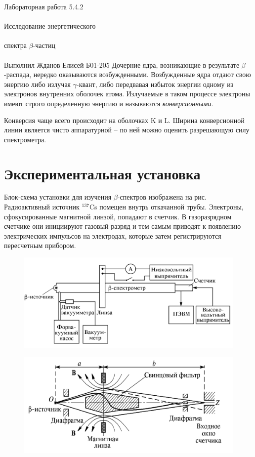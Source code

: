 \documentclass{astroedu-lab}
\begin{document}
\begin{problem}{\huge Лабораторная работа 5.4.2\\\\Исследование энергетического\\\\спектра $\beta$-частиц\\\\Выполнил Жданов Елисей Б01-205}
	Дочерние ядра, возникающие в результате $\beta$-распада, нередко оказываются возбужденными. Возбужденные ядра отдают свою энергию либо излучая $\gamma$-квант, либо передвавая избыток энергии одному из электронов внутренних оболочек атома. Излучаемые в таком процессе электроны имеют строго определенную энергию и называются \textit{конверсионными}.
	
	Конверсия чаще всего происходит на оболочках K и L. Ширина конверсионной линии является чисто аппаратурной -- по ней можно оценить разрешающую силу спектрометра.
	

\section{Экспериментальная установка}

Блок-схема установки для изучения $\beta$-спектров изображена на рис. Радиоактивный источник $^{137}$Cs помещен внутрь откачанной трубы. Электроны, сфокусированные магнитной линзой, попадают в счетчик. В газоразрядном счетчике они инициируют газовый разряд и тем самым приводят к появлению электрических импульсов на электродах, которые затем регистрируются пересчетным прибором.
	
	
\begin{figure}[!h]
	\centering
	\includegraphics[width=1\textwidth]{shema.png}
	\label{fig:boiler}
\end{figure}
	

\begin{figure}[!h]
	\centering
	\includegraphics[width=1\textwidth]{ustanovka.png}
	\label{fig:boiler}
\end{figure}	
	


\end{problem}
\end{document}
